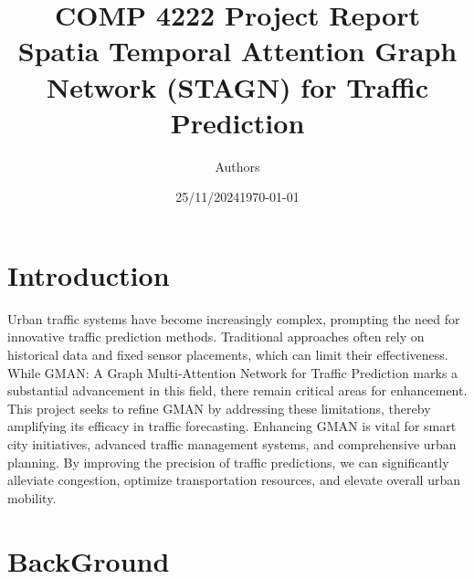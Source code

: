 \documentclass[12pt,reqno]{article}
\title{
    \vspace{2cm} %
    \vspace{1cm} %
    \textbf{\Large COMP 4222  Project Report \\ \Huge Spatia Temporal Attention Graph Network (STAGN) for Traffic Prediction} \\ %
}
\author{Authors}
\date{25/11/2024}
\date{\today}
\begin{document}
\maketitle
\thispagestyle{empty}
\newpage
\setcounter{page}{1}  %
\tableofcontents
\newpage

\section{Introduction}
Urban traffic systems have become increasingly complex, prompting the need for
innovative traffic prediction methods. Traditional approaches often rely on historical data and
fixed sensor placements, which can limit their effectiveness.\newline
\newline
While GMAN: A Graph Multi-Attention Network for Traffic Prediction marks a
substantial advancement in this field, there remain critical areas for enhancement. This project
seeks to refine GMAN by addressing these limitations, thereby amplifying its efficacy in traffic
forecasting. Enhancing GMAN is vital for smart city initiatives, advanced traffic management
systems, and comprehensive urban planning. By improving the precision of traffic predictions,
we can significantly alleviate congestion, optimize transportation resources, and elevate overall
urban mobility.

\section{BackGround}
\end{document}

